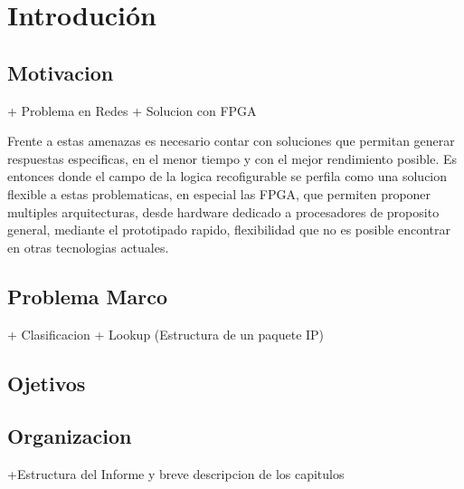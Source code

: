 \chapter{Introdución}

\section{Motivacion}

+ Problema en Redes
+ Solucion con FPGA

Frente a estas amenazas es necesario contar con soluciones que permitan generar respuestas especificas, en el menor tiempo y con el mejor rendimiento posible. Es entonces donde el campo de la logica recofigurable se perfila como una solucion flexible a estas problematicas, en especial las FPGA, que permiten proponer multiples arquitecturas, desde hardware dedicado a procesadores de proposito general, mediante el prototipado rapido, flexibilidad que no es posible encontrar en otras tecnologias actuales.

\section{Problema Marco}

+ Clasificacion
+ Lookup (Estructura de un paquete IP)

\section{Ojetivos}
\section{Organizacion}
+Estructura del Informe y breve descripcion de los capitulos





